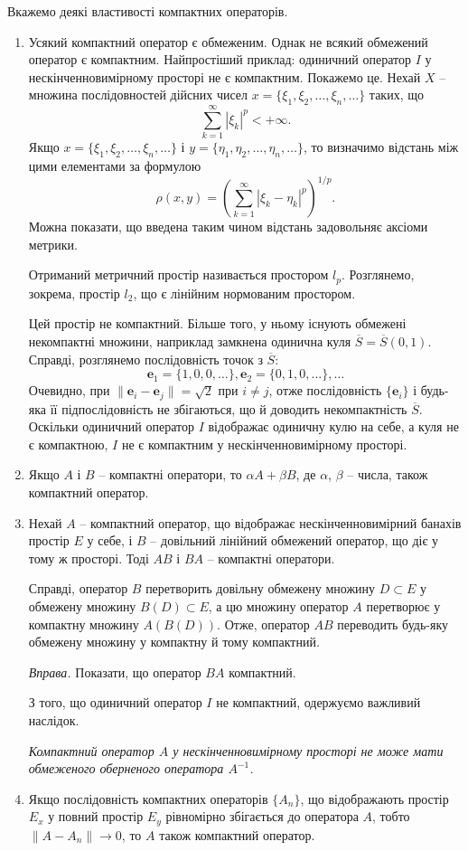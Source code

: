 \documentclass[14pt,twoside]{extreport}
\theoremstyle{mystyle}
\numberwithin{equation}{chapter}
\begin{document}
Вкажемо деякі властивості компактних операторів.
\begin{enumerate}
	\item Усякий компактний оператор є обмеженим. Однак не всякий обмежений оператор є компактним. Найпростіший приклад: одиничний оператор $I$ у нескінченновимірному просторі не є компактним. Покажемо це. Нехай $X$ -- множина послідовностей дійсних чисел $x=\{\xi_1, \xi_2, \ldots, \xi_n, \ldots\}$ таких, що
\[
 \sum_{k=1}^{\infty} |\xi_k|^p < +\infty.
\]
	Якщо $x=\{\xi_1, \xi_2, \ldots, \xi_n, \ldots\}$ і $y=\{\eta_1, \eta_2, \ldots, \eta_n, \ldots\}$, то визначимо відстань між цими елементами за формулою
\[
 \rho(x, y) =\left(\sum_{k=1}^{\infty}|\xi_k-\eta_k|^p\right)^{1/p}.
\]
	Можна показати, що введена таким чином відстань задовольняє аксіоми метрики.
	
	Отриманий метричний простір називається простором $l_p$. Розглянемо, зокрема, простір $l_2$, що є лінійним нормованим простором.
	
	Цей простір не компактний. Більше того, у ньому існують обмежені некомпактні множини, наприклад замкнена одинична куля $\overline{S} = \overline{S}(0, 1)$. Справді, розглянемо послідовність точок з $\overline{S}$:
\[
 \mathbf{e}_1=\{1, 0, 0, \ldots\}, \mathbf{e}_2=\{0, 1, 0, \ldots\}, \ldots
\]
	Очевидно,  при $\|\mathbf{e}_i-\mathbf{e}_j\|=\sqrt{2}$ при $i \neq j$, отже послідовність $\{\mathbf{e}_i\}$ і будь-яка її підпослідовність не збігаються, що й доводить некомпактність $\overline{S}$. Оскільки одиничний оператор $I$ відображає одиничну кулю на себе, а куля не є компактною, $I$ не є компактним у нескінченновимірному просторі.
	\item Якщо $A$ і $B$ -- компактні оператори, то $\alpha A + \beta B$, де $\alpha$, $\beta$ -- числа, також компактний оператор.
	\item Нехай $A$ -- компактний оператор, що відображає нескінченновимірний банахів простір $E$ у себе, і $B$ -- довільний лінійний обмежений оператор, що діє у тому ж просторі. Тоді $AB$ і $BA$ -- компактні оператори.

	Справді, оператор $B$ перетворить довільну обмежену множину $D \subset E$ у обмежену множину $B(D) \subset E$, а цю множину оператор $A$ перетворює у компактну множину $A(B(D))$. Отже, оператор $AB$ переводить будь-яку обмежену множину у компактну й тому компактний.

\begin{small}
 \emph{Вправа.} Показати, що оператор $BA$ компактний.
\end{small}

З того, що одиничний оператор $I$ не компактний, одержуємо важливий наслідок.

\emph{Компактний оператор $A$ у нескінченновимірному просторі не може мати обмеженого оберненого оператора $A^{-1}$.}
\item  Якщо послідовність компактних операторів $\{A_n\}$, що відображають простір $E_x$ у повний простір $E_y$ рівномірно збігається до оператора $A$, тобто $\|A - A_n\| \to 0$, то $A$ також компактний оператор.
\end{enumerate}
\end{document}
